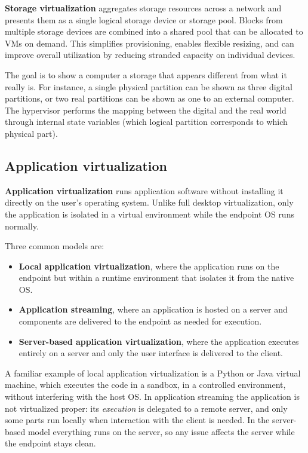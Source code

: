 \textbf{Storage virtualization} aggregates storage resources across a network and presents them as a single logical storage device or storage pool. Blocks from multiple storage devices are combined into a shared pool that can be allocated to VMs on demand. This simplifies provisioning, enables flexible resizing, and can improve overall utilization by reducing stranded capacity on individual devices.

The goal is to show a computer a storage that appears different from what it really is. For instance, a single physical partition can be shown as three digital partitions, or two real partitions can be shown as one to an external computer. The hypervisor performs the mapping between the digital and the real world through internal state variables (which logical partition corresponds to which physical part).

\begin{center}
\end{center}

\subsection{Application virtualization}

\textbf{Application virtualization} runs application software without installing it directly on the user's operating system. Unlike full desktop virtualization, only the application is isolated in a virtual environment while the endpoint OS runs normally.

Three common models are:

\begin{itemize}
\item \textbf{Local application virtualization}, where the application runs on the endpoint but within a runtime environment that isolates it from the native OS.
\item \textbf{Application streaming}, where an application is hosted on a server and components are delivered to the endpoint as needed for execution.
\item \textbf{Server-based application virtualization}, where the application executes entirely on a server and only the user interface is delivered to the client.
\end{itemize}

A familiar example of local application virtualization is a Python or Java virtual machine, which executes the code in a sandbox, in a controlled environment, without interfering with the host OS. In application streaming the application is not virtualized proper: its \emph{execution} is delegated to a remote server, and only some parts run locally when interaction with the client is needed. In the server-based model everything runs on the server, so any issue affects the server while the endpoint stays clean.

